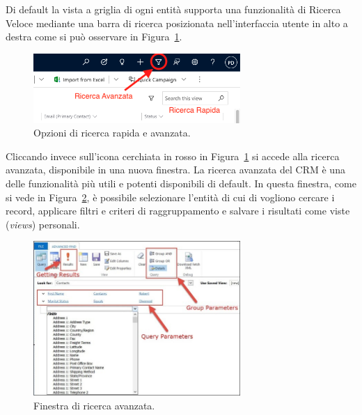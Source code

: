Di default la vista a griglia di ogni entità supporta una funzionalità di Ricerca Veloce mediante una barra di ricerca posizionata nell'interfaccia utente in alto a destra come si può osservare in Figura~\ref{fig:quickSearch}.
\begin{figure}[ht]
  \centering
  \includegraphics[width=0.7\textwidth]{quick-search.png}
  \caption{Opzioni di ricerca rapida e avanzata.}
  \label{fig:quickSearch}
\end{figure}

Cliccando invece sull'icona cerchiata in rosso in Figura~\ref{fig:quickSearch} si accede alla ricerca avanzata, disponibile in una nuova finestra. La ricerca avanzata del CRM è una delle funzionalità più utili e potenti disponibili di default. In questa finestra, come si vede in Figura~\ref{fig:advancedSearch}, è possibile selezionare l'entità di cui di vogliono cercare i record, applicare filtri e criteri di raggruppamento e salvare i risultati come viste (\textit{views}) personali.
\begin{figure}[ht]
  \centering
  \includegraphics[width=0.7\textwidth]{advanced-search.png}
  \caption{Finestra di ricerca avanzata.}
  \label{fig:advancedSearch}
\end{figure}

